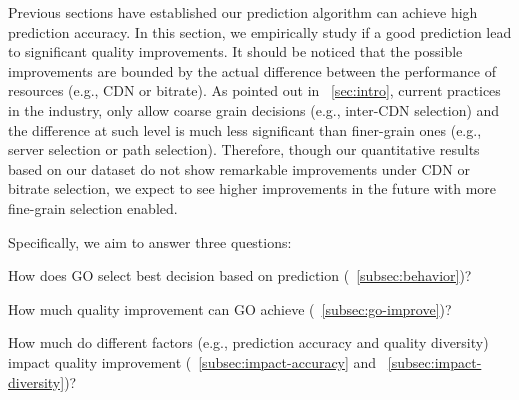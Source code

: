 \label{sec:improvement}

Previous sections have established our prediction algorithm can achieve high prediction accuracy. In this section, we empirically study if a good prediction lead to significant quality improvements. It should be noticed that the possible improvements are bounded by the actual difference between the performance of resources (e.g., CDN or bitrate). As pointed out in \Section~\ref{sec:intro}, current practices in the industry, only allow coarse grain decisions (e.g., inter-CDN selection) and the difference at such level is much less significant than finer-grain ones (e.g., server selection or path selection). Therefore, though our quantitative results based on our dataset do not show remarkable improvements under CDN or bitrate selection, we expect to see higher improvements in the future with more fine-grain selection enabled.

Specifically, we aim to answer three questions:
\begin{packedenumerate}
	\item How does GO select best decision based on prediction (\Section~\ref{subsec:behavior})?
	\item How much quality improvement can GO achieve (\Section~\ref{subsec:go-improve})?
	\item How much do different factors (e.g., prediction accuracy and quality diversity) impact quality improvement (\Section~\ref{subsec:impact-accuracy} and ~\ref{subsec:impact-diversity})?
\end{packedenumerate}


